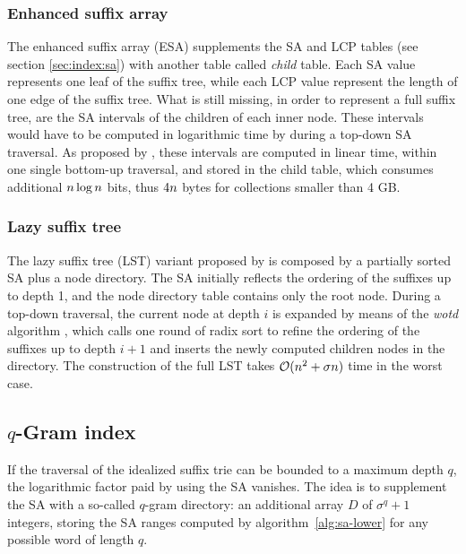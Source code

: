 \subsubsection{Enhanced suffix array}
\label{sec:index:esa}

The enhanced suffix array (ESA) \citep{Abouelhoda2004} supplements the SA and LCP tables (see section \ref{sec:index:sa}) with another table called \emph{child} table.
Each SA value represents one leaf of the suffix tree, while each LCP value represent the length of one edge of the suffix tree.
What is still missing, in order to represent a full suffix tree, are the SA intervals of the children of each inner node.
These intervals would have to be computed in logarithmic time by  during a top-down SA traversal.
As proposed by \cite{Abouelhoda2004}, these intervals are computed in linear time, within one single bottom-up traversal, and stored in the child table, which consumes additional $n \log n$ bits, thus $4n$ bytes for collections smaller than 4 GB.

\subsubsection{Lazy suffix tree}
\label{sec:index:lst}

The lazy suffix tree (LST) \citep{Giegerich1999} variant proposed by \citep{Weese2013} is composed by a partially sorted SA plus a node directory.
The SA initially reflects the ordering of the suffixes up to depth 1, and the node directory table contains only the root node.
During a top-down traversal, the current node at depth $i$ is expanded by means of the \emph{wotd} algorithm \citep{Giegerich1999}, which calls one round of radix sort to refine the ordering of the suffixes up to depth $i + 1$ and inserts the newly computed children nodes in the directory.
The construction of the full LST takes $\mathcal{O}(n^2 + \sigma n)$ time in the worst case.

\subsection{$q$-Gram index}
\label{sec:index:qgram}

If the traversal of the idealized suffix trie can be bounded to a maximum depth $q$, the logarithmic factor paid by using the SA vanishes.
The idea is to supplement the SA with a so-called $q$-gram directory: an additional array $D$ of $\sigma^q + 1$ integers, storing the SA ranges computed by algorithm~\ref{alg:sa-lower} for any possible word of length $q$.

